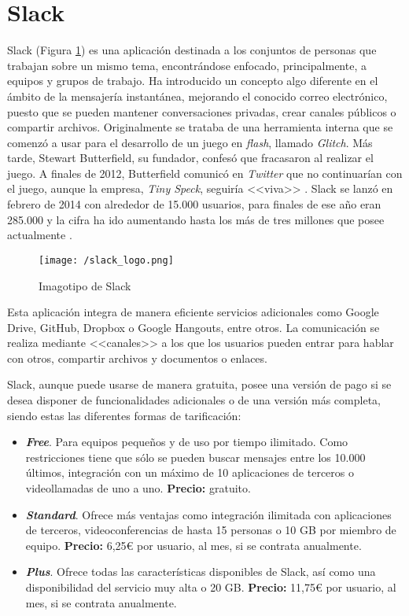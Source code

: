 \section{Slack}
\label{sec:slack}

Slack (Figura \ref{fig:slack}) es una aplicación destinada a los conjuntos de personas que trabajan sobre un mismo tema, encontrándose enfocado, principalmente, a equipos y grupos de trabajo. Ha introducido un concepto algo diferente en el ámbito de la mensajería instantánea, mejorando el conocido correo electrónico, puesto que se pueden mantener conversaciones privadas, crear canales públicos o compartir archivos. Originalmente se trataba de una herramienta interna que se comenzó a usar para el desarrollo de un juego en \textit{flash}, llamado \textit{Glitch}. Más tarde, Stewart Butterfield, su fundador, confesó que fracasaron al realizar el juego. A finales de 2012, Butterfield comunicó en \textit{Twitter} que no continuarían con el juego, aunque la empresa, \textit{Tiny Speck}, seguiría <<viva>> \cite{Thomas2015}. Slack se lanzó en febrero de 2014 con alrededor de 15.000 usuarios, para finales de ese año eran 285.000 y la cifra ha ido aumentando hasta los más de tres millones que posee actualmente \cite{PyMEs2017}.

\begin{figure}[!h]
	\begin{center}
		\texttt{[image: /slack\_logo.png]}
		\caption{Imagotipo de Slack}
		\label{fig:slack}
	\end{center}
\end{figure}

Esta aplicación integra de manera eficiente servicios adicionales como Google Drive, \mbox{GitHub}, Dropbox o Google Hangouts, entre otros. La comunicación se realiza mediante <<canales>> a los que los usuarios pueden entrar para hablar con otros, compartir archivos y documentos o enlaces.

\clearpage

Slack, aunque puede usarse de manera gratuita, posee una versión de pago si se desea disponer de funcionalidades adicionales o de una versión más completa, siendo estas las diferentes formas de tarificación:

\begin{itemize}
	\item \textbf{\textit{Free}}. Para equipos pequeños y de uso por tiempo ilimitado. Como restricciones tiene que sólo se pueden buscar mensajes entre los 10.000 últimos, integración con un máximo de 10 aplicaciones de terceros o videollamadas de uno a uno. \textbf{Precio:} gratuito.
	\item \textbf{\textit{Standard}}. Ofrece más ventajas como integración ilimitada con aplicaciones de terceros, videoconferencias de hasta 15 personas o 10 \acs{GB} por miembro de equipo. \textbf{Precio:} 6,25\euro{} por usuario, al mes, si se contrata anualmente.
	\item \textbf{\textit{Plus}}. Ofrece todas las características disponibles de Slack, así como una disponibilidad del servicio muy alta o 20 \acs{GB}. \textbf{Precio:} 11,75\euro{} por usuario, al mes, si se contrata anualmente.
\end{itemize}

